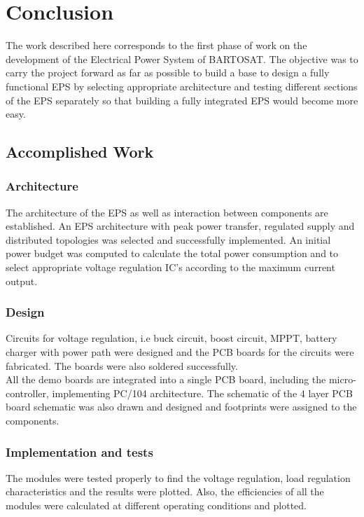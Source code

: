 

\chapter{Conclusion}

The work described here corresponds to the first phase of work on the development of the
Electrical Power System of BARTOSAT. The objective was to carry the project forward as far as
possible to build a base to design a fully functional EPS by selecting appropriate architecture and testing different sections of the EPS separately so that building a fully integrated EPS would become more easy.

\section{Accomplished Work}
\subsection{Architecture}
The architecture of the EPS as well as interaction between components are established. An EPS architecture with peak power transfer, regulated supply and distributed topologies was selected and successfully implemented. An initial power budget was computed to calculate the total power consumption and to select appropriate voltage regulation IC's according to the maximum current output.

\subsection{Design}

Circuits for voltage regulation, i.e buck circuit, boost circuit, MPPT, battery charger with power path were designed and the PCB boards for the circuits were fabricated. The boards were also soldered successfully. \\
All the demo boards are integrated into a single PCB board, including the micro-controller, implementing PC/104 architecture. The schematic of the 4 layer PCB board schematic was also drawn and designed and footprints were assigned to the components. 

\subsection{Implementation and tests}
The modules were tested properly to find the voltage regulation, load regulation characteristics and the results were plotted. Also, the efficiencies of all the modules were calculated at different operating conditions and plotted. 

